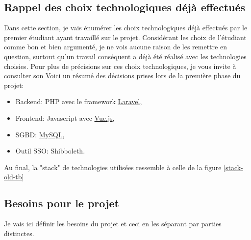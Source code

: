 \documentclass[
    iai, %
    il, %
]{heig-tb}
\begin{document}
\subsection{Rappel des choix technologiques déjà effectués}
Dans cette section, je vais énumérer les choix technologiques déjà effectués par le premier étudiant ayant travaillé sur le projet.\newline
Considérant les choix de l'étudiant comme bon et bien argumenté, je ne vois aucune raison de les remettre en question, surtout qu'un travail conséquent a déjà été réalisé avec les technologies choisies. Pour plus de précisions sur ces choix technologiques, je vous invite à consulter son %
Voici un résumé des décisions prises lors de la première phase du projet:
\begin{itemize}
    \item Backend: PHP avec le framework \href{https://laravel.com/}{Laravel},
    \item Frontend: Javascript avec \href{https://vuejs.org/}{Vue.js},
    \item SGBD: \href{https://www.mysql.com/}{MySQL},
    \item Outil SSO: Shibboleth. %
\end{itemize}

Au final, la "stack" de technologies utilisées ressemble à celle de la figure \ref{stack-old-tb}



\subsection{Besoins pour le projet}
Je vais ici définir les besoins du projet et ceci en les séparant par parties distinctes.
\end{document}
